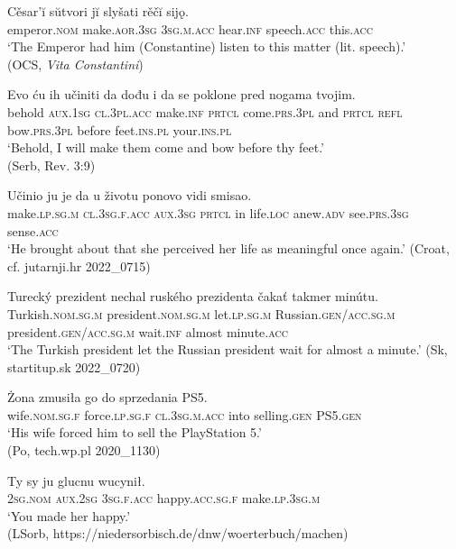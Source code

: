 \documentclass[output=paper]{langscibook}
\begin{document}
\ea%
    \label{ex:junghanns:6}
  \ea \gll   Cěsar’ĭ sŭtvori jĭ slyšati rěčĭ sijǫ.\\
    emperor.\textsc{nom} make.\textsc{aor.3sg} \textsc{3sg.m.acc} hear.\textsc{inf} speech.\textsc{acc} this.\textsc{acc}\\
    \glt ‘The Emperor had him (Constantine) listen to this matter (lit. speech).’\\ \hfill (OCS, \textit{Vita Constantini}) \label{ex:junghanns:6a}

  \ex \gll   Evo ću ih učiniti da dođu i da se poklone pred nogama  tvojim.\\
    behold \textsc{aux}.\textsc{1sg} \textsc{cl.3pl.acc} make.\textsc{inf} \textsc{prtcl} come.\textsc{prs.3pl} and \textsc{prtcl} \textsc{refl} bow.\textsc{prs.3pl} before feet.\textsc{ins.pl} your.\textsc{ins.pl}\\
    \glt ‘Behold, I will make them come and bow before thy feet.’ \\ \hfill (Serb, Rev. 3:9)

  \ex \gll   Učinio ju je da u životu ponovo vidi smisao.\\
    make.\textsc{lp.sg.m} \textsc{cl.3sg.f.acc} \textsc{aux}.\textsc{3sg} \textsc{prtcl} in life.\textsc{loc} anew.\textsc{adv} see.\textsc{prs.3sg} sense.\textsc{acc}\\
    \glt ‘He brought about that she perceived her life as meaningful once again.’ \hfill (Croat, cf. jutarnji.hr 2022\_0715)

  \ex \gll Turecký prezident nechal ruského prezidenta čakať takmer minútu.\\
    Turkish.\textsc{nom.sg.m} president.\textsc{nom.sg.m} let.\textsc{lp.sg.m} Russian.\textsc{gen/acc.sg.m} president.\textsc{gen/acc.sg.m} wait.\textsc{inf} almost minute.\textsc{acc}\\
    \glt ‘The Turkish president let the Russian president wait for almost a minute.’ \hfill (Sk, startitup.sk 2022\_0720)

  \ex \gll  Żona zmusiła go do sprzedania PS5.\\
    wife.\textsc{nom.sg.f} force.\textsc{lp.sg.f} \textsc{cl.3sg.m.acc} into selling.\textsc{gen} {PS5.\textsc{gen}}\\
    \glt ‘His wife forced him to sell the PlayStation 5.’ \\ \hfill (Po, {tech.wp.pl 2020\_1130)}

  \ex \gll   Ty sy ju glucnu wucynił.\\
    \textsc{2sg.nom} \textsc{aux}.\textsc{2sg} \textsc{3sg.f.acc} happy.\textsc{acc.sg.f} make.\textsc{lp.3sg.m}\\
    \glt ‘You made her happy.’ \\ \hfill(LSorb, https://niedersorbisch.de/dnw/woerterbuch/machen)
\end{document}
